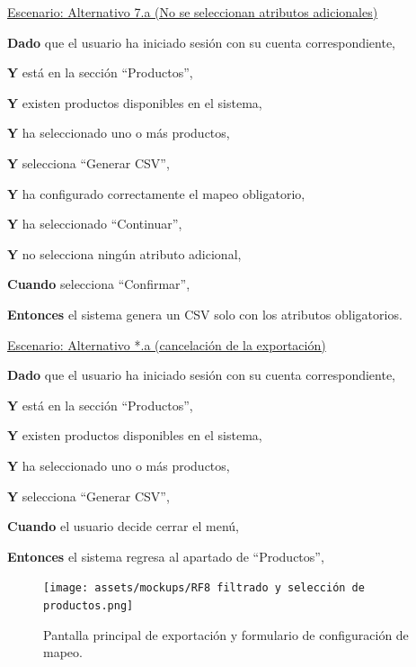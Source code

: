 \underline{Escenario: Alternativo 7.a (No se seleccionan atributos adicionales)}\par
\textbf{Dado} que el usuario ha iniciado sesión con su cuenta correspondiente,\par
\textbf{Y} está en la sección \enquote{Productos},\par
\textbf{Y} existen productos disponibles en el sistema,\par
\textbf{Y} ha seleccionado uno o más productos,\par
\textbf{Y} selecciona \enquote{Generar CSV},\par
\textbf{Y} ha configurado correctamente el mapeo obligatorio,\par
\textbf{Y} ha seleccionado \enquote{Continuar},\par
\textbf{Y} no selecciona ningún atributo adicional,\par
\textbf{Cuando} selecciona \enquote{Confirmar},\par
\textbf{Entonces} el sistema genera un CSV solo con los atributos obligatorios.\par
\vspace{0.20cm}

\underline{Escenario: Alternativo *.a (cancelación de la exportación)}\par
\vspace{0.15cm}
\textbf{Dado} que el usuario ha iniciado sesión con su cuenta correspondiente,\par
\textbf{Y} está en la sección \enquote{Productos},\par
\textbf{Y} existen productos disponibles en el sistema,\par
\textbf{Y} ha seleccionado uno o más productos,\par
\textbf{Y} selecciona \enquote{Generar CSV},\par
\textbf{Cuando} el usuario decide cerrar el menú,\par
\textbf{Entonces} el sistema regresa al apartado de \enquote{Productos},\par

\begin{figure}[H]
    \texttt{[image: assets/mockups/RF8 filtrado y selección de productos.png]}
    \caption{Pantalla principal de exportación y formulario de configuración de mapeo.}
\end{figure}

